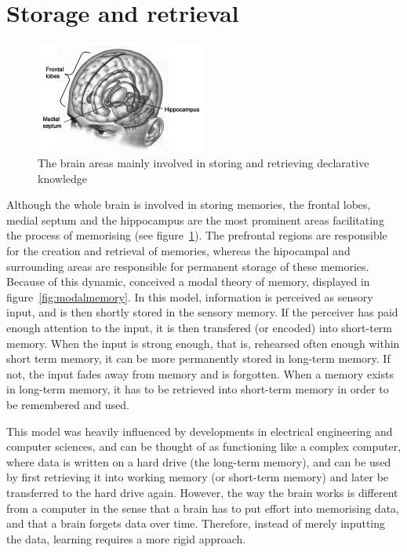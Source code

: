 \section{Storage and retrieval}

\begin{figure}
    \centering
    \includegraphics[width=0.5\textwidth]{img/brainareas.png}
    \caption{The brain areas mainly involved in storing and retrieving declarative knowledge \protect\cite{amnesia}}
    \label{fig:brainareas}
\end{figure}

Although the whole brain is involved in storing memories, the frontal lobes, medial septum and the hippocampus are the most prominent areas facilitating the process of memorising \cite{cognitivepsychology} (see figure~\ref{fig:brainareas}). The prefrontal regions are responsible for the creation and retrieval of memories, whereas the hipocampal and surrounding areas are responsible for permanent storage of these memories. Because of this dynamic,  conceived a modal theory of memory, displayed in figure~\ref{fig:modalmemory}. In this model, information is perceived as sensory input, and is then shortly stored in the sensory memory. If the perceiver has paid enough attention to the input, it is then transfered (or encoded) into short-term memory. When the input is strong enough, that is, rehearsed often enough within short term memory, it can be more permanently stored in long-term memory. If not, the input fades away from memory and is forgotten. When a memory exists in long-term memory, it has to be retrieved into short-term memory in order to be remembered and used.

This model was heavily influenced by developments in electrical engineering and computer sciences, and can be thought of as functioning like a complex computer, where data is written on a hard drive (the long-term memory), and can be used by first retrieving it into working memory (or short-term memory) and later be transferred to the hard drive again. However, the way the brain works is different from a computer in the sense that a brain has to put effort into memorising data, and that a brain forgets data over time. Therefore, instead of merely inputting the data, learning requires a more rigid approach.

